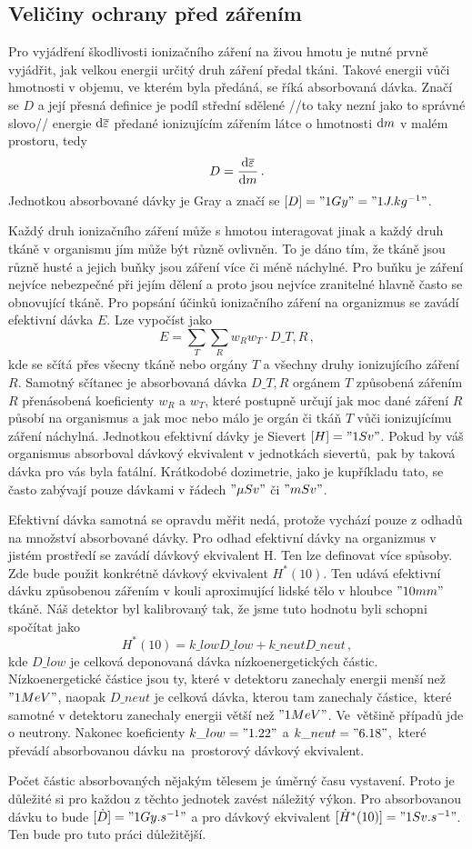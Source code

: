 \documentclass[11pt,a4paper]{article}
\begin{document}
\subsection*{Veličiny ochrany před zářením}
Pro vyjádření škodlivosti ionizačního záření na živou hmotu je nutné
prvně vyjádřit, jak velkou energii určitý druh záření předal tkáni.
Takové energii vůči hmotnosti v objemu, ve kterém byla předáná, se říká
absorbovaná dávka. Značí se $ D $ a její přesná definice je podíl střední
sdělené //to taky nezní jako to správné slovo// energie $\mathrm{d} \overline{\varepsilon}$ předané ionizujícím zářením
látce o hmotnosti $\mathrm{d} m$ v malém prostoru, tedy
$$D=\frac{\mathrm{d} \overline{\varepsilon}}{\mathrm{d} m}\,.$$
Jednotkou absorbované dávky je Gray a značí se ${[D]="1 Gy"="1 J.kg^{-1}"}$.\par
Každý druh ionizačního záření může s hmotou interagovat jinak a každý druh tkáně
v organismu jím může být různě ovlivněn. To je dáno tím, že tkáně jsou různě
husté a jejich buňky jsou záření více či méně náchylné. Pro buňku je záření
nejvíce nebezpečné při jejím dělení a proto jsou nejvíce zranitelné hlavně
často se obnovující tkáně. Pro popsání účinků ionizačního záření na organizmus
se zavádí efektivní dávka $E$. Lze vypočíst jako
$$E=\sum_{T}\sum_{R} w_R w_T\cdot D\_{T,R}\,,$$
kde se sčítá přes všecny tkáně nebo orgány $T$ a všechny druhy ionizujícího
záření $R$. Samotný sčítanec je absorbovaná dávka $D\_{T,R}$ orgánem $T$
způsobená zářením $R$ přenásobená koeficienty $w_R$ a $w_T$, které postupně
určují jak moc dané záření $R$ působí na organismus a jak moc nebo málo je
orgán či tkáň $T$ vůči ionizujícímu záření náchylná. Jednotkou efektivní dávky
je Sievert ${[H]="1 Sv"}$. Pokud by váš organismus absorboval dávkový ekvivalent
v jednotkách sievertů,~pak by taková dávka pro vás byla fatální. Krátkodobé
dozimetrie, jako je kupříkladu tato, se často zabývají pouze dávkami v řádech
$ "\mu Sv" $ či $ "mSv" $.\par
Efektivní dávka samotná se opravdu měřit nedá, protože vychází pouze z odhadů na
množství absorbované dávky. Pro odhad efektivní dávky na organizmus v jistém
prostředí se zavádí dávkový ekvivalent H. Ten lze definovat více spůsoby. Zde
bude použit konkrétně dávkový ekvivalent $ H^\ast(10) $. Ten udává efektivní
dávku způsobenou zářením v kouli aproximující lidské tělo v hloubce
$"10 mm"$ tkáně. Náš detektor byl kalibrovaný tak, že jsme tuto hodnotu byli
schopni spočítat jako
$$H^\ast(10)=k\_{low}D\_{low}+k\_{neut}D\_{neut}\,,$$
kde $D\_{low}$ je celková deponovaná dávka nízkoenergetických částic.
Nízkoenergetické částice jsou ty, které v detektoru zanechaly energii menší než
$ "1 MeV" $, naopak $ D\_{neut} $ je celková dávka, kterou tam zanechaly
částice,~které samotné v detektoru zanechaly energii větší než $ "1 MeV" $.
Ve~většině případů jde o neutrony. Nakonec koeficienty
$ k\_{low}="1.22" $ a $ k\_{neut}="6.18" $,~které převádí absorbovanou dávku
na~prostorový dávkový ekvivalent.\par
Počet částic absorbovaných nějakým tělesem je úměrný času vystavení. Proto je
důležité si pro každou z těchto jednotek zavést náležitý výkon. Pro absorbovanou
dávku to bude $ [\dot{D}]="1 Gy.s^{-1}" $ a pro dávkový ekvivalent
$ [\dot{H}^\ast(10)]="1 Sv.s^{-1}" $. Ten bude pro tuto práci důležitější.
\end{document}
